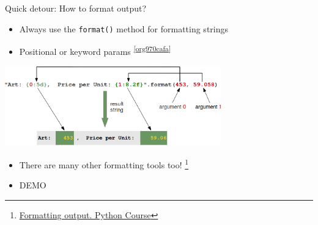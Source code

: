 \documentclass[presentation]{beamer}
\begin{document}
\begin{frame}[label={sec:orgfb3a041},fragile]{Quick detour: How to format output?}
 \begin{itemize}
\item Always use the \texttt{format()} method for formatting strings
\item Positional or keyword params \textsuperscript{\cref{org970cafa}}
\end{itemize}
\begin{center}
\includegraphics[width=0.7\textwidth]{images/format_method_positional_parameters.png}
\end{center}
\begin{itemize}
\item There are many other formatting tools too! \footnote{\href{https://www.python-course.eu/python3\_formatted\_output.php}{Formatting output. Python Course}}
\item \alert{DEMO}
\end{itemize}
\end{frame}
\end{document}
